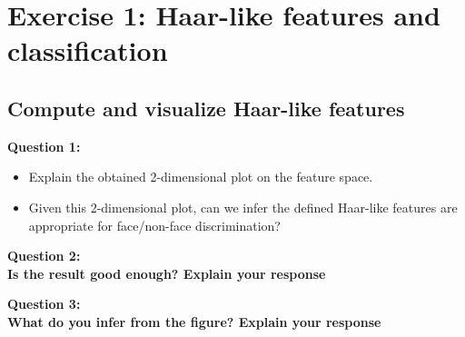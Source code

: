 \section{Exercise 1: Haar-like features and classification}

\subsection{Compute and visualize Haar-like features}

{\bfseries
Question 1:
\begin{itemize}
\item Explain the obtained 2-dimensional plot on the feature space.
\item Given this 2-dimensional plot, can we infer the defined Haar-like features
			are appropriate for face/non-face discrimination?
\end{itemize}}


{\bfseries Question 2: \\Is the result good enough? Explain your response}

{\bfseries Question 3: \\What do you infer from the figure? Explain your response}
